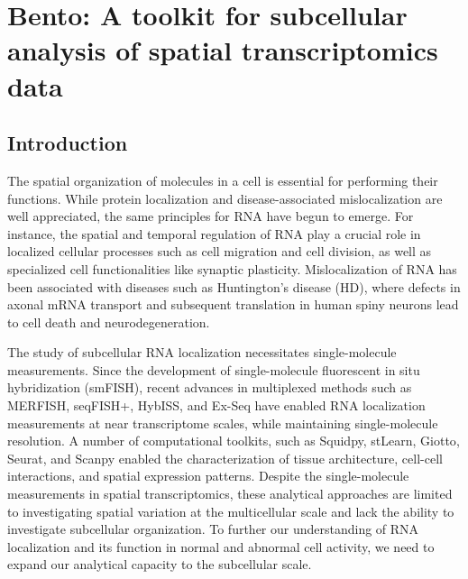 \chapter{Bento: A toolkit for subcellular analysis of spatial transcriptomics data}
\label{chap:chapter 1}

\section{Introduction}

The spatial organization of molecules in a cell is essential for performing their functions. While protein localization\cite{thulSubcellularMapHuman2017} and disease-associated mislocalization are well appreciated\cite{laurilaPredictionDiseaserelatedMutations2009,parkProteinLocalizationPrincipal2011}, the same principles for RNA have begun to emerge. For instance, the spatial and temporal regulation of RNA play a crucial role in localized cellular processes such as cell migration and cell division\cite{lecuyerGlobalAnalysisMRNA2007,bovairdBiologicalFunctionsRegulatory2018}, as well as specialized cell functionalities like synaptic plasticity\cite{dasTravelsMRNAsNeurons2019,sahooAxonalMRNATransport2018,kugelgenConservationCoreNeurite2020}. Mislocalization of RNA has been associated with diseases such as Huntington's disease (HD), where defects in axonal mRNA transport and subsequent translation in human spiny neurons lead to cell death and neurodegeneration\cite{culverHuntingtonDiseaseProtein2016,romoFreshLookHuntingtin2018,whiteHuntingtinDifferentiallyRegulates2015,fernandopulleRNATransportLocal2021}.

The study of subcellular RNA localization necessitates single-molecule measurements. Since the development of single-molecule fluorescent in situ hybridization (smFISH), recent advances in multiplexed methods such as MERFISH\cite{chenRNAImagingSpatially2015}, seqFISH+\cite{engTranscriptomescaleSuperresolvedImaging2019}, HybISS\cite{gyllborgHybridizationbasedSituSequencing2020}, and Ex-Seq\cite{alonExpansionSequencingSpatially} have enabled RNA localization measurements at near transcriptome scales, while maintaining single-molecule resolution. A number of computational toolkits, such as Squidpy\cite{pallaSquidpyScalableFramework2021}, stLearn\cite{phamStLearnIntegratingSpatial2020}, Giotto\cite{driesGiottoToolboxIntegrative2021}, Seurat\cite{butlerIntegratedAnalysisSingle2017}, and Scanpy\cite{wolfSCANPYLargescaleSinglecell2018} enabled the characterization of tissue architecture, cell-cell interactions, and spatial expression patterns. Despite the single-molecule measurements in spatial transcriptomics, these analytical approaches are limited to investigating spatial variation at the multicellular scale and lack the ability to investigate subcellular organization. To further our understanding of RNA localization and its function in normal and abnormal cell activity, we need to expand our analytical capacity to the subcellular scale.

